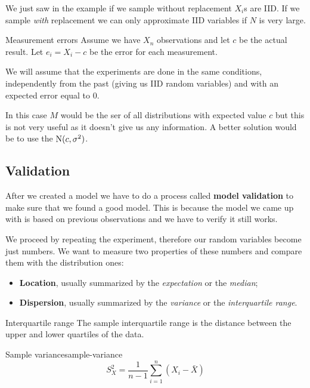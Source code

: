 \documentclass[12pt]{extarticle}
\newcommand{\Normal}{{\operatorfont N}}
\begin{document}
We just saw in the example if we sample without replacement $X_i$s are IID.
If we sample \textit{with} replacement we can only approximate IID variables if $N$ is very large.

\begin{example}{Measurement errors}{}
    Assume we have $X_n$ observations and let $c$ be the actual result.
    Let $e_i = X_i - c$ be the error for each measurement.

    We will assume that the experiments are done in the same conditions, independently from the past (giving us IID random variables) and with an expected error equal to $0$.

    In this case $M$ would be the ser of all distributions with expected value $c$ but this is not very useful as it doesn't give us any information.
    A better solution would be to use the $\Normal(c, \sigma^2)$.
\end{example}

\subsection{Validation}

After we created a model we have to do a process called \textbf{model validation} to make sure that we found a good model.
This is because the model we came up with is based on previous observations and we have to verify it still works.

We proceed by repeating the experiment, therefore our random variables become just numbers. We want to measure two properties of these numbers and compare them with the distribution ones:
\begin{itemize}
    \item \textbf{Location}, usually summarized by the \textit{expectation} or the \textit{median};
    \item \textbf{Dispersion}, usually summarized by the \textit{variance} or the \textit{interquartile range}.
\end{itemize}

\begin{remark}{Interquartile range}{}
    The sample interquartile range is the distance between the upper and lower quartiles of the data.
\end{remark}

\begin{definition}{Sample variance}{sample-variance}
    \begin{equation}
        S_X^2 = \frac{1}{n-1} \sum^n_{i = 1}(X_i - \bar X)
    \end{equation}
\end{definition}
\end{document}
